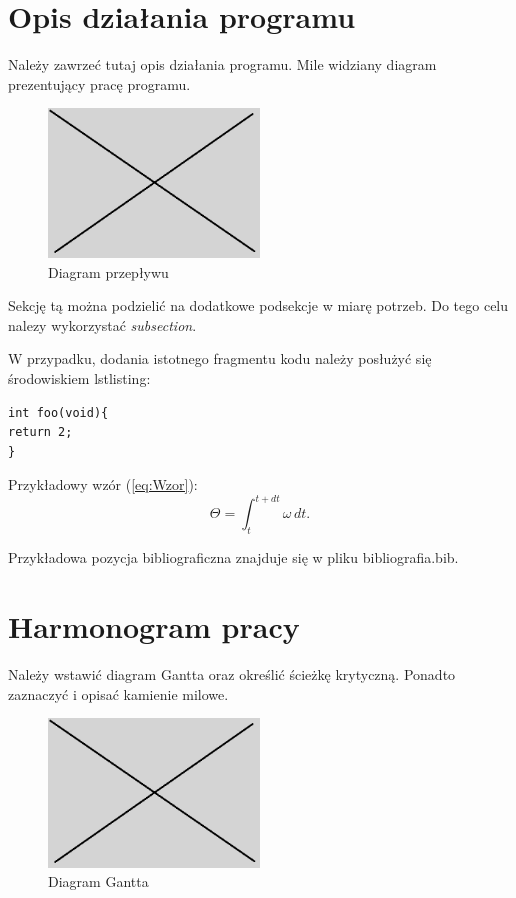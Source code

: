 \documentclass[10pt, a4paper]{article}
\begin{document}
\section{Opis działania programu}

Należy zawrzeć tutaj opis działania programu.
Mile widziany diagram prezentujący pracę programu.

\begin{figure}[H]
	\centering
	\includegraphics[width=0.5\textwidth]{figures/obraz.png}
	\caption{Diagram przepływu}
	\label{fig:Program}
\end{figure}

Sekcję tą można podzielić na dodatkowe podsekcje w miarę potrzeb. 
Do tego celu nalezy wykorzystać \textit{subsection}.

W przypadku, dodania istotnego fragmentu kodu należy posłużyć się środowiskiem 
lstlisting:

\begin{lstlisting}[tabsize=2]
int foo(void){
return 2;
}
\end{lstlisting}

Przykładowy wzór (\ref{eq:Wzor}):
\begin{equation}
\label{eq:Wzor}
\Theta = \int_t^{t+dt} \omega \, dt.	
\end{equation}

Przykładowa pozycja bibliograficzna \cite{SR01} znajduje się 
w pliku bibliografia.bib.

\section{Harmonogram pracy}

Należy wstawić diagram Gantta oraz określić ścieżkę 
krytyczną. Ponadto zaznaczyć i opisać kamienie milowe.

\begin{figure}[H]
	\centering
	\includegraphics[width=0.5\textwidth]{figures/obraz.png}
	\caption{Diagram Gantta}
	\label{fig:DiagramGantta}
\end{figure}
\end{document}
